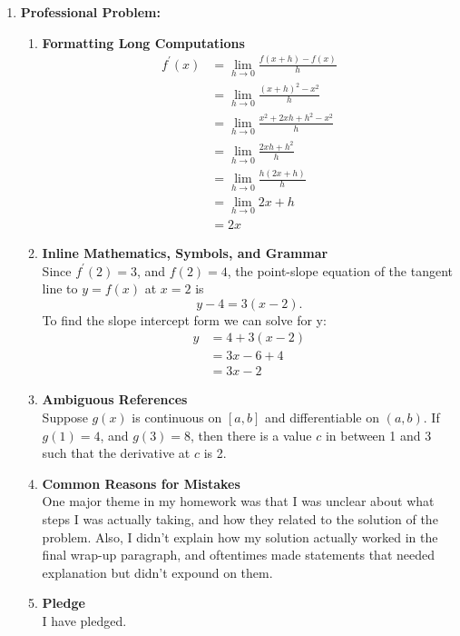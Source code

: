 \documentclass{article}
\begin{document}
\begin{enumerate}[label=\textbf{(12.\arabic*)}]
\newpage



\item \textbf{Professional Problem:}

\begin{enumerate}[label=(\alph*)]



\item \textbf{Formatting Long Computations} 
\begin{align*}
f^\prime(x) &= \lim_{h \to 0} \frac{f(x+h)-f(x)}{h} \\
&= \lim_{h \to 0} \frac{{\left(x+h\right)}^2-x^2}{h} \\
&= \lim_{h \to 0} \frac{x^2+2xh+h^2-x^2}{h} \\
&= \lim_{h \to 0} \frac{2xh+h^2}{h} \\
&= \lim_{h \to 0} \frac{h\left(2x+h\right)}{h} \\
&= \lim_{h \to 0} 2x+h \\
&= 2x
\end{align*}


\item \textbf{Inline Mathematics, Symbols, and Grammar} \\

Since $f^\prime(2)=3$, and $f(2)=4$, the point-slope equation of the tangent line to $y=f(x)$ at $x=2$ is
\[y-4 = 3 \left(x-2\right)\text{.}\]
To find the slope intercept form we can solve for y:
\begin{align*}
y&=4+3\left(x-2\right)\\
&=3x-6+4\\
&=3x-2
\end{align*}


\item \textbf{Ambiguous References} \\

Suppose $g(x)$ is continuous on $\left[a,b\right]$ and differentiable on $\left(a,b\right)$. If $g(1)=4$, and $g(3)=8$, then there is a value $c$ in between 1 and 3 such that the derivative at $c$ is 2. \\


\item \textbf{Common Reasons for Mistakes} \\

One major theme in my homework was that I was unclear about what steps I was actually taking, and how they related to the solution of the problem. Also, I didn't explain how my solution actually worked in the final wrap-up paragraph, and oftentimes made statements that needed explanation but didn't expound on them. \\


\item \textbf{Pledge} \\

I have pledged.




\end{enumerate}
   
\end{enumerate}
\end{document}
